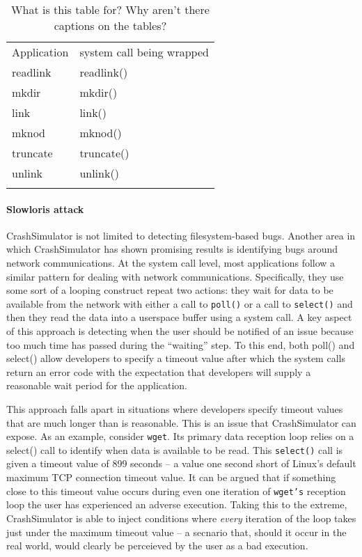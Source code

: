 \begin{table*}[t]
  \scriptsize{}
  \begin{tabular}{l | l}
    Application  & system call being wrapped\\
    readlink     & readlink()\\
    mkdir        & mkdir()\\
    link         & link()\\
    mknod        & mknod()\\
    truncate     & truncate()\\
    unlink       & unlink()\\
  \bottomrule{}
  \end{tabular}
  \caption{What is this table for?  Why aren't there captions on the
tables?}
\end{table*}

\paragraph{Slowloris attack}

CrashSimulator is not limited to detecting filesystem-based bugs.  Another area in which CrashSimulator has
shown promising results is identifying bugs around network communications.  At the system call level, most
applications follow a similar pattern for dealing with network communications.  Specifically, they use some
sort of a looping construct repeat two actions: they wait for data to be available from the network with
either a call to {\tt poll()} or a call to {\tt select()} and then they read the data into a userspace
buffer using a system call.  A key aspect of this approach is detecting when the user should be notified of
an issue because too much time has passed during the ``waiting'' step.  To this end, both poll() and
select() allow developers to specify a timeout value after which the system calls return an error code with
the expectation that developers will supply a reasonable wait period for the application.

This approach falls apart in situations where developers specify timeout values that are much longer than is
reasonable.  This is an issue that CrashSimulator can expose.  As an example, consider {\tt wget}.  Its
primary data reception loop relies on a select() call to identify when data is available to be read.  This
{\tt select()} call is given a timeout value of 899 seconds -- a value one second short of Linux's default
maximum TCP connection timeout value.  It can be argued that if something close to this timeout value
occurs during even one iteration of {\tt wget's} reception loop the user has experienced an adverse
execution.  Taking this to the extreme, CrashSimulator is able to inject conditions where \emph{every}
iteration of the loop takes just under the maximum timeout value -- a secnario that, should it occur in the
real world, would clearly be perceieved by the user as a bad execution.

